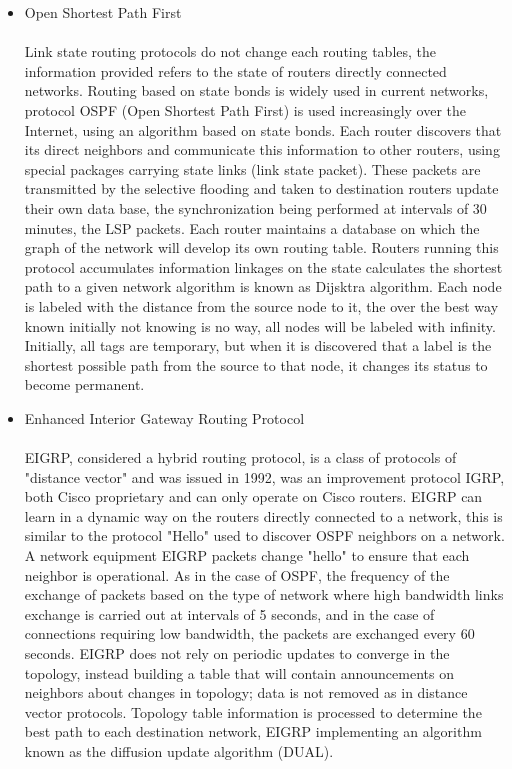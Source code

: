 \documentclass[conference,compsoc]{IEEEtran}
\begin{document}
\begin{itemize}
\item 
Open Shortest Path First\\\\
Link state routing protocols do not change each routing tables, the information provided refers to the state of routers directly connected networks. Routing based on state bonds is widely used in current networks, protocol OSPF (Open Shortest Path First) is used increasingly over the Internet, using an algorithm based on state bonds. Each router discovers that its direct neighbors and communicate this information to other routers, using special packages carrying state links (link state packet). These packets are transmitted by the selective flooding and taken to destination routers update their own data base, the synchronization being performed at intervals of 30 minutes, the LSP packets. Each router maintains a database on which the graph of the network will develop its own routing table. Routers running this protocol accumulates information linkages on the state calculates the shortest path to a given network algorithm is known as Dijsktra algorithm. Each node is labeled with the distance from the source node to it, the over the best way known initially not knowing is no way, all nodes will be labeled with infinity. Initially, all tags are temporary, but when it is discovered that a label is the shortest possible path from the source to that node, it changes its status to become permanent.

\item 
Enhanced Interior Gateway Routing Protocol\\\\
EIGRP, considered a hybrid routing protocol, is a class of protocols of "distance vector" and was issued in 1992, was an improvement protocol IGRP, both Cisco proprietary and can only operate on Cisco routers. EIGRP can learn in a dynamic way on the routers directly connected to a network, this is similar to the protocol "Hello" used to discover OSPF neighbors on a network. A network equipment EIGRP packets change "hello" to ensure that each neighbor is operational. As in the case of OSPF, the frequency of the exchange of packets based on the type of network where high bandwidth links exchange is carried out at intervals of 5 seconds, and in the case of connections requiring low bandwidth, the packets are exchanged every 60 seconds. EIGRP does not rely on periodic updates to converge in the topology, instead building a table that will contain announcements on neighbors about changes in topology; data is not removed as in distance vector protocols. Topology table information is processed to determine the best path to each destination network, EIGRP implementing an algorithm known as the diffusion update algorithm (DUAL).


\end{itemize}
\end{document}
